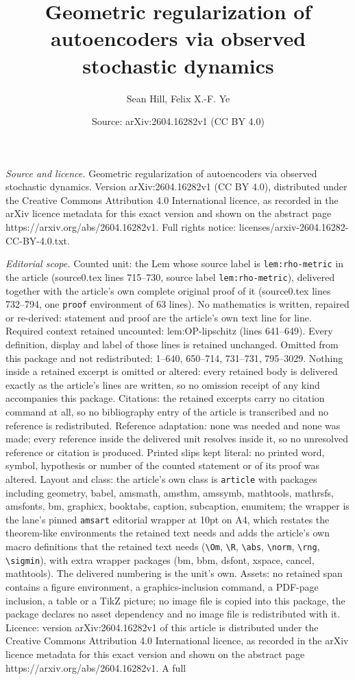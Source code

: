 \documentclass[10pt,a4paper]{amsart}
\title[Geometric regularization of autoencoders via observed stocha]{Geometric regularization of autoencoders via observed stochastic dynamics}
\author{Sean Hill, Felix X.-F. Ye}
\date{Source: arXiv:2604.16282v1 (CC BY 4.0)}
\begin{document}
\maketitle

\noindent\emph{Source and licence.} Geometric regularization of autoencoders via observed stochastic dynamics. Version arXiv:2604.16282v1 (CC BY 4.0), distributed under the Creative Commons Attribution 4.0 International licence, as recorded in the arXiv licence metadata for this exact version and shown on the abstract page https://arxiv.org/abs/2604.16282v1. Full rights notice: licenses/arxiv-2604.16282-CC-BY-4.0.txt.\par\smallskip

\noindent\textit{Editorial scope.} Counted unit: the Lem whose source label is \texttt{lem:rho-metric} in the article (source0.tex lines 715--730, source label \texttt{lem:rho-metric}), delivered together with the article's own complete original proof of it (source0.tex lines 732--794, one \texttt{proof} environment of 63 lines). No mathematics is written, repaired or re-derived: statement and proof are the article's own text line for line. Required context retained uncounted: lem:OP-lipschitz (lines 641--649). Every definition, display and label of those lines is retained unchanged. Omitted from this package and not redistributed: 1--640, 650--714, 731--731, 795--3029. Nothing inside a retained excerpt is omitted or altered: every retained body is delivered exactly as the article's lines are written, so no omission receipt of any kind accompanies this package. Citations: the retained excerpts carry no citation command at all, so no bibliography entry of the article is transcribed and no reference is redistributed. Reference adaptation: none was needed and none was made; every reference inside the delivered unit resolves inside it, so no unresolved reference or citation is produced. Printed slips kept literal: no printed word, symbol, hypothesis or number of the counted statement or of its proof was altered. Layout and class: the article's own class is \texttt{article} with packages including geometry, babel, amsmath, amsthm, amssymb, mathtools, mathrsfs, amsfonts, bm, graphicx, booktabs, caption, subcaption, enumitem; the wrapper is the lane's pinned \texttt{amsart} editorial wrapper at 10pt on A4, which restates the theorem-like environments the retained text needs and adds the article's own macro definitions that the retained text needs (\texttt{\textbackslash Om}, \texttt{\textbackslash R}, \texttt{\textbackslash abs}, \texttt{\textbackslash norm}, \texttt{\textbackslash rng}, \texttt{\textbackslash sigmin}), with extra wrapper packages (bm, bbm, dsfont, xspace, cancel, mathtools). The delivered numbering is the unit's own. Assets: no retained span contains a figure environment, a graphics-inclusion command, a PDF-page inclusion, a table or a TikZ picture; no image file is copied into this package, the package declares no asset dependency and no image file is redistributed with it. Licence: version arXiv:2604.16282v1 of this article is distributed under the Creative Commons Attribution 4.0 International licence, as recorded in the arXiv licence metadata for this exact version and shown on the abstract page https://arxiv.org/abs/2604.16282v1. A full 
\end{document}

